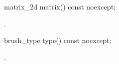 \begin{itemdecl}
    matrix_2d matrix() const noexcept;
\end{itemdecl}
\begin{itemdescr}
	\pnum
	\returns
	.

\end{itemdescr}

\begin{itemdecl}
    brush_type type() const noexcept;
\end{itemdecl}
\begin{itemdescr}
	\pnum
	\returns
	.

\end{itemdescr}
